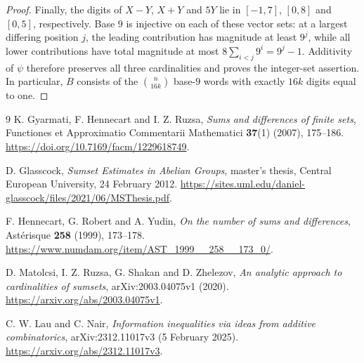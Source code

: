\documentclass[11pt,a4paper]{article}
\begin{document}
\begin{proof}
Finally, the digits of $X-Y$, $X+Y$ and $5Y$ lie in $[-1,7]$,
$[0,8]$ and $[0,5]$, respectively. Base $9$ is injective on each
of these vector sets: at a largest differing position $j$, the leading
contribution has magnitude at least $9^j$, while all lower contributions
have total magnitude at most $8\sum_{i<j}9^i=9^j-1$. Additivity of
$\psi$ therefore preserves all three cardinalities and proves the
integer-set assertion. In particular, $B$ consists of the
$\binom{n}{16k}$ base-$9$ words with exactly $16k$ digits equal to one.
\end{proof}

\begin{thebibliography}{9}
K. Gyarmati, F. Hennecart and I. Z. Ruzsa,
\emph{Sums and differences of finite sets},
Functiones et Approximatio Commentarii Mathematici
\textbf{37}(1) (2007), 175--186.
\url{https://doi.org/10.7169/facm/1229618749}.

D. Glasscock,
\emph{Sumset Estimates in Abelian Groups},
master's thesis, Central European University, 24 February 2012.
\url{https://sites.uml.edu/daniel-glasscock/files/2021/06/MSThesis.pdf}.

F. Hennecart, G. Robert and A. Yudin,
\emph{On the number of sums and differences},
Ast\'erisque \textbf{258} (1999), 173--178.
\url{https://www.numdam.org/item/AST_1999__258__173_0/}.

D. Matolcsi, I. Z. Ruzsa, G. Shakan and D. Zhelezov,
\emph{An analytic approach to cardinalities of sumsets},
arXiv:2003.04075v1 (2020).
\url{https://arxiv.org/abs/2003.04075v1}.

C. W. Lau and C. Nair,
\emph{Information inequalities via ideas from additive combinatorics},
arXiv:2312.11017v3 (5 February 2025).
\url{https://arxiv.org/abs/2312.11017v3}.
\end{thebibliography}
\end{document}
